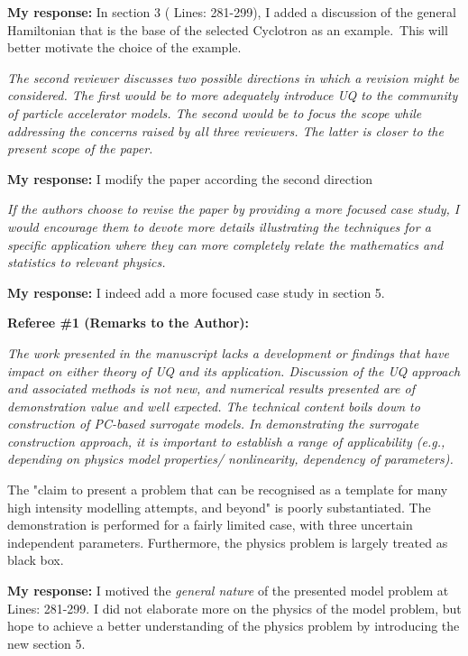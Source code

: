 \documentclass{article}
\newcommand{\atline}[1]{\color{red} Lines: #1\color{blue}}
\begin{document}
{\bf My response: }{\color{blue}  In section 3 (\atline{281-299}), I added a  discussion of the general Hamiltonian that is the base of the selected Cyclotron as an example.\ This will better motivate the choice of the example.}


{\it The second reviewer discusses two possible directions in which a revision might be considered. The first would be to more adequately introduce UQ to the community of particle accelerator models. The second would be to focus the scope while addressing the concerns raised by all three reviewers. The latter is closer to the present scope of the paper. }

{\bf My response: }{\color{blue} I modify the paper according the second direction} 

{\it If the authors choose to revise the paper by providing a more focused case study, I would encourage them to devote more details illustrating the techniques for a specific application where they can more completely relate the mathematics and statistics to relevant physics. }

{\bf My response:} {\color{blue}I indeed add a more focused case study in section 5.}


{\bf Referee \#1 (Remarks to the Author): }

{\it The work presented in the manuscript lacks a development or findings that have impact on either theory of UQ and its application. Discussion of the UQ approach and associated methods is not new, and numerical results presented are of demonstration value and well expected. The technical content boils down to construction of PC-based surrogate models. In demonstrating the surrogate construction approach, it is important to establish a range of applicability (e.g., depending on physics model properties/ nonlinearity, dependency of parameters). 

The "claim to present a problem that can be recognised as a template for many high intensity modelling attempts, and beyond" is poorly substantiated. The demonstration is performed for a fairly limited case, with three uncertain independent parameters. Furthermore, the physics problem is largely treated as black box. 
}

{\bf My response: }{\color{blue} I motived the {\it general nature} of the presented model problem at \atline{281-299}. I did not elaborate more on the physics of the model problem, but hope to achieve a better understanding of the physics problem by 
introducing the new section 5.}
\end{document}
